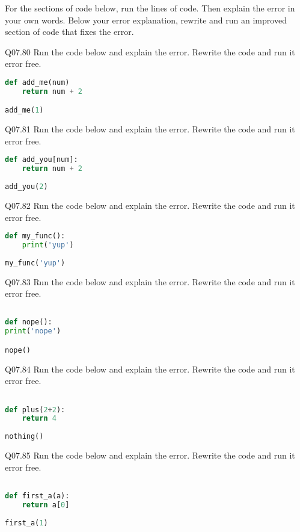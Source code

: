 \documentclass{book}
\begin{document}
For the sections of code below, run the lines of code. Then explain the
error in your own words. Below your error explanation, rewrite and run
an improved section of code that fixes the error.

Q07.80 Run the code below and explain the error. Rewrite the code and
run it error free.

\begin{lstlisting}[language=Python]
def add_me(num)
    return num + 2

add_me(1)
\end{lstlisting}

Q07.81 Run the code below and explain the error. Rewrite the code and
run it error free.

\begin{lstlisting}[language=Python]
def add_you[num]:
    return num + 2
    
add_you(2)
\end{lstlisting}

Q07.82 Run the code below and explain the error. Rewrite the code and
run it error free.

\begin{lstlisting}[language=Python]
def my_func():
    print('yup')
    
my_func('yup')
\end{lstlisting}

Q07.83 Run the code below and explain the error. Rewrite the code and
run it error free.

\begin{lstlisting}[language=Python]

def nope():
print('nope')

nope()
\end{lstlisting}

Q07.84 Run the code below and explain the error. Rewrite the code and
run it error free.

\begin{lstlisting}[language=Python]

def plus(2+2):
    return 4 
    
nothing()
\end{lstlisting}

Q07.85 Run the code below and explain the error. Rewrite the code and
run it error free.

\begin{lstlisting}[language=Python]

def first_a(a):
    return a[0]
    
first_a(1)
\end{lstlisting}
    
\end{document}
